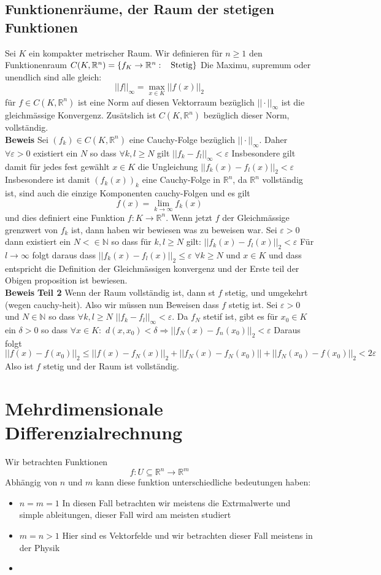 \documentclass{article}
\newcommand{\smspc}{\hspace{0.3cm}}
\newcommand{\beweis}{\\\textbf{Beweis }}
\begin{document}
\subsection*{Funktionenräume, der Raum der stetigen Funktionen}
Sei $K$ ein kompakter metrischer Raum. Wir definieren für $n\ge 1$ den Funktionenraum $C(K,\mathbb{R}^n)=\left\lbrace f_K \rightarrow \mathbb{R}^n: \smspc \text{Stetig}\right\rbrace$ Die Maximu, supremum oder unendlich sind alle gleich:
\[||f||_{\infty}=\max_{x\in K}||f(x)||_2\]
für $f\in C(K, \mathbb{R}^n)$ ist eine Norm auf diesen Vektorraum bezüglich $||\cdot||_\infty$ ist die gleichmässige Konvergenz. Zusätslich ist $C(K, \mathbb{R}^n)$ bezüglich dieser Norm, vollständig.
\beweis Sei $(f_k)\in C(K, \mathbb{R}^n)$ eine Cauchy-Folge bezüglich $||\cdot||_\infty$. Daher $\forall \varepsilon>0$ existiert ein $N$ so dass $\forall k,l\ge N$ gilt $||f_k-f_l||_\infty < \varepsilon$ Insbesondere gilt damit für jedes fest gewählt $x\in K$ die Ungleichung $||f_k(x)-f_l(x)||_2< \varepsilon$
Insbesondere ist damit $(f_k(x))_k$ eine Cauchy-Folge in $\mathbb{R}^n$, da $\mathbb{R}^n$ vollständig ist, sind auch die einzige Komponenten cauchy-Folgen und es gilt 
\[f(x)=\lim_{k\rightarrow\infty}f_k(x)\] und dies definiert eine Funktion $f:K \rightarrow \mathbb{R}^n$. Wenn jetzt $f$ der Gleichmässige grenzwert von $f_k$ ist, dann haben wir bewiesen was zu beweisen war.
\newline Sei $\varepsilon > 0$ dann existiert ein $N<\in \mathbb{N}$ so dass für $k,l\ge N$ gilt: $||f_k(x)-f_l(x)||_2< \varepsilon$ Für $l \rightarrow\infty$ folgt daraus dass $||f_k(x)-f_l(x)||_2\le \varepsilon$ $\forall k\ge N$ und $x\in K$ und dass entspricht die Definition der Gleichmässigen konvergenz und der Erste teil der Obigen proposition ist bewiesen.
\beweis \textbf{Teil 2} Wenn der Raum vollständig ist, dann st $f$ stetig, und umgekehrt (wegen cauchy-heit). Also wir müssen nun Beweisen dass $f$ stetig ist.
\newline Sei $\varepsilon >0$ und $N\in \mathbb{N}$ so dass $\forall k,l\ge N$ $||f_k-f_l||_{\infty}< \varepsilon$. Da $f_N$ stetif ist, gibt es für $x_0\in K$ ein $\delta>0$ so dass $\forall x\in K:$ $d(x,x_0)<\delta \Rightarrow ||f_N(x)-f_n(x_0)||_2< \varepsilon$ Daraus folgt $||f(x)-f(x_0)||_2 \le ||f(x)-f_N(x)||_2+||f_N(x)-f_N(x_0)||+||f_N(x_0)-f(x_0)||_2< 2 \varepsilon$ Also ist $f$ stetig und der Raum ist vollständig.
\section*{Mehrdimensionale Differenzialrechnung}
Wir betrachten Funktionen \[f:U \subseteq \mathbb{R}^n \rightarrow \mathbb{R}^m\]
Abhängig von $n$ und $m$ kann diese funktion unterschiedliche bedeutungen haben:
\begin{itemize}
  \item[]{$n=m=1$ In diesen Fall betrachten wir meistens die Extrmalwerte und simple ableitungen, dieser Fall wird am meisten studiert}
  \item[]{$m=n>1$ Hier sind es Vektorfelde und wir betrachten dieser Fall meistens in der Physik}
  \item[]{}
\end{itemize}
\end{document}

